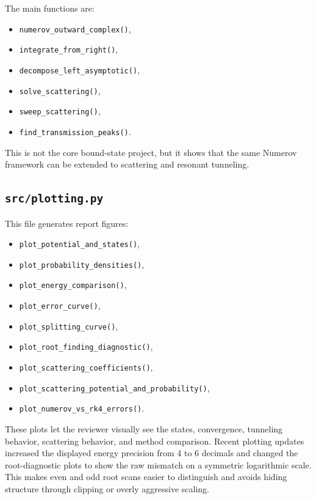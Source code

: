 \documentclass[11pt]{article}
\begin{document}
    The main functions are:
    \begin{itemize}
        \item \texttt{numerov\_outward\_complex()},
        \item \texttt{integrate\_from\_right()},
        \item \texttt{decompose\_left\_asymptotic()},
        \item \texttt{solve\_scattering()},
        \item \texttt{sweep\_scattering()},
        \item \texttt{find\_transmission\_peaks()}.
    \end{itemize}

    This is not the core bound-state project, but it shows that the same Numerov framework can be extended to scattering and resonant tunneling.

    \subsection{\texttt{src/plotting.py}}

    This file generates report figures:
    \begin{itemize}
        \item \texttt{plot\_potential\_and\_states()},
        \item \texttt{plot\_probability\_densities()},
        \item \texttt{plot\_energy\_comparison()},
        \item \texttt{plot\_error\_curve()},
        \item \texttt{plot\_splitting\_curve()},
        \item \texttt{plot\_root\_finding\_diagnostic()},
        \item \texttt{plot\_scattering\_coefficients()},
        \item \texttt{plot\_scattering\_potential\_and\_probability()},
        \item \texttt{plot\_numerov\_vs\_rk4\_errors()}.
    \end{itemize}

    These plots let the reviewer visually see the states, convergence, tunneling behavior, scattering behavior, and method comparison. Recent plotting updates increased the displayed energy precision from 4 to 6 decimals and changed the root-diagnostic plots to show the raw mismatch on a symmetric logarithmic scale. This makes even and odd root scans easier to distinguish and avoids hiding structure through clipping or overly aggressive scaling.
\end{document}
